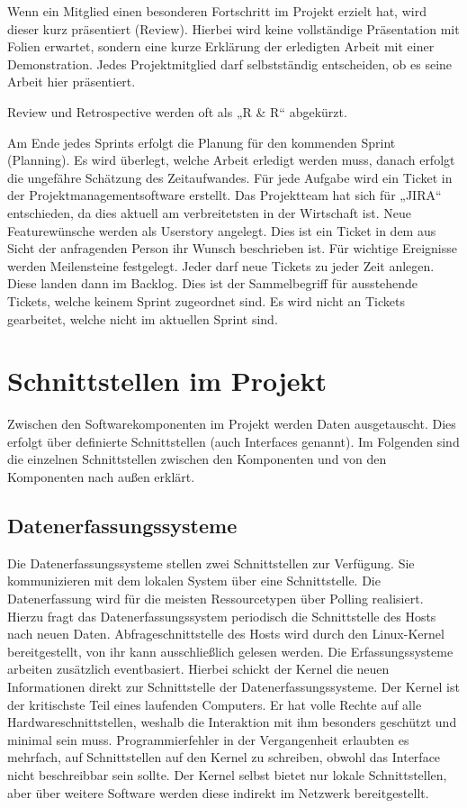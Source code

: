 Wenn ein Mitglied einen besonderen Fortschritt im Projekt erzielt hat, wird
dieser kurz präsentiert (Review). Hierbei wird keine vollständige Präsentation
mit Folien erwartet, sondern eine kurze Erklärung der erledigten Arbeit mit
einer Demonstration. Jedes Projektmitglied darf selbstständig entscheiden, ob
es seine Arbeit hier präsentiert.

Review und Retrospective werden oft als „R \& R“ abgekürzt.

Am Ende jedes Sprints erfolgt die Planung für den kommenden Sprint (Planning).
Es wird überlegt, welche Arbeit erledigt werden muss, danach erfolgt die
ungefähre Schätzung des Zeitaufwandes. Für jede Aufgabe wird ein Ticket in der
Projektmanagementsoftware erstellt. Das Projektteam hat sich für „JIRA“
entschieden, da dies aktuell am verbreitetsten in der Wirtschaft ist. Neue
Featurewünsche werden als Userstory angelegt. Dies ist ein Ticket in dem aus
Sicht der anfragenden Person ihr Wunsch beschrieben ist. Für wichtige
Ereignisse werden Meilensteine festgelegt. Jeder darf neue Tickets zu jeder
Zeit anlegen. Diese landen dann im \gls{Backlog}. Dies ist der Sammelbegriff
für ausstehende Tickets, welche keinem Sprint zugeordnet sind. Es wird nicht an
Tickets gearbeitet, welche nicht im aktuellen Sprint sind.
\tm%

\chapter{Schnittstellen im Projekt}
Zwischen den Softwarekomponenten im Projekt werden Daten ausgetauscht. Dies
erfolgt über definierte Schnittstellen (auch Interfaces genannt). Im Folgenden
sind die einzelnen Schnittstellen zwischen den Komponenten und von den
Komponenten nach außen erklärt.
\tm%

\section{Datenerfassungssysteme}
Die Datenerfassungssysteme stellen zwei Schnittstellen zur Verfügung. Sie
kommunizieren mit dem lokalen System über eine
 Schnittstelle. Die Datenerfassung wird
für die meisten Ressourcetypen über Polling realisiert. Hierzu fragt das
Datenerfassungssystem periodisch die Schnittstelle des Hosts nach neuen Daten.
Abfrageschnittstelle des Hosts wird durch den Linux\hyp{}Kernel bereitgestellt,
von ihr kann ausschließlich gelesen werden. Die Erfassungssysteme arbeiten
zusätzlich eventbasiert. Hierbei schickt der Kernel die neuen Informationen
direkt zur Schnittstelle der Datenerfassungssysteme. Der Kernel ist der
kritischste Teil eines laufenden Computers. Er hat volle Rechte auf alle
Hardwareschnittstellen, weshalb die Interaktion mit ihm besonders geschützt und
minimal sein muss. Programmierfehler in der Vergangenheit erlaubten es
mehrfach, auf Schnittstellen auf den Kernel zu schreiben, obwohl das Interface
nicht beschreibbar sein sollte. Der Kernel selbst bietet nur lokale
Schnittstellen, aber über weitere Software werden diese indirekt im Netzwerk
bereitgestellt.

